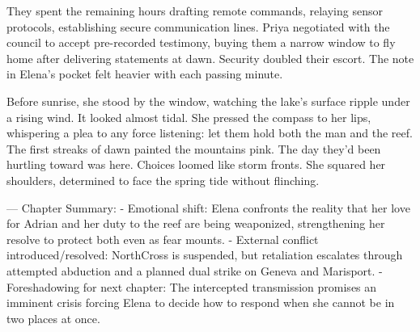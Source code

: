 They spent the remaining hours drafting remote commands, relaying sensor protocols, establishing secure communication lines. Priya negotiated with the council to accept pre-recorded testimony, buying them a narrow window to fly home after delivering statements at dawn. Security doubled their escort. The note in Elena's pocket felt heavier with each passing minute.

Before sunrise, she stood by the window, watching the lake's surface ripple under a rising wind. It looked almost tidal. She pressed the compass to her lips, whispering a plea to any force listening: let them hold both the man and the reef. The first streaks of dawn painted the mountains pink. The day they'd been hurtling toward was here. Choices loomed like storm fronts. She squared her shoulders, determined to face the spring tide without flinching.

\bigskip

---
Chapter Summary:
- Emotional shift: Elena confronts the reality that her love for Adrian and her duty to the reef are being weaponized, strengthening her resolve to protect both even as fear mounts.
- External conflict introduced/resolved: NorthCross is suspended, but retaliation escalates through attempted abduction and a planned dual strike on Geneva and Marisport.
- Foreshadowing for next chapter: The intercepted transmission promises an imminent crisis forcing Elena to decide how to respond when she cannot be in two places at once.
